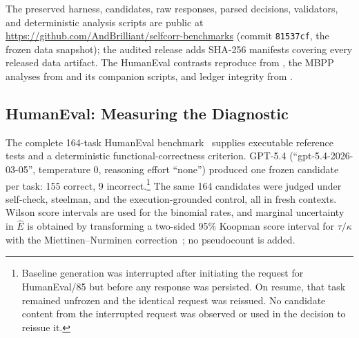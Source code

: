 \documentclass[a4paper,journal]{IAENGtran}
\begin{document}
The preserved harness, candidates, raw responses, parsed decisions, validators, and
deterministic analysis scripts are public at
\url{https://github.com/AndBrilliant/selfcorr-benchmarks} (commit
\texttt{81537cf}, the frozen data snapshot); the audited release adds SHA-256
manifests covering every released data artifact. The HumanEval contrasts
reproduce from , the MBPP analyses from
 and its companion scripts, and ledger integrity from
.

\subsection{HumanEval: Measuring the Diagnostic}

The complete 164-task HumanEval benchmark~\cite{chen2021codex} supplies executable
reference tests and a deterministic functional-correctness criterion. GPT-5.4
(``gpt-5.4-2026-03-05'', temperature 0, reasoning effort ``none'') produced one frozen
candidate per task: 155 correct, 9 incorrect.\footnote{Baseline generation was
interrupted after initiating the request for HumanEval/85 but before any response was
persisted. On resume, that task remained unfrozen and the identical request was
reissued. No candidate content from the interrupted request was observed or used in the
decision to reissue it.} The same 164 candidates were judged under
self-check, steelman, and the execution-grounded control, all in fresh contexts. Wilson
score intervals are used for the binomial rates, and marginal uncertainty in $\hat E$ is
obtained by transforming a two-sided 95\% Koopman score interval for $\tau/\kappa$ with
the Miettinen--Nurminen correction~\cite{koopman1984ratio,miettinen1985comparative};
no pseudocount is added.
\end{document}

